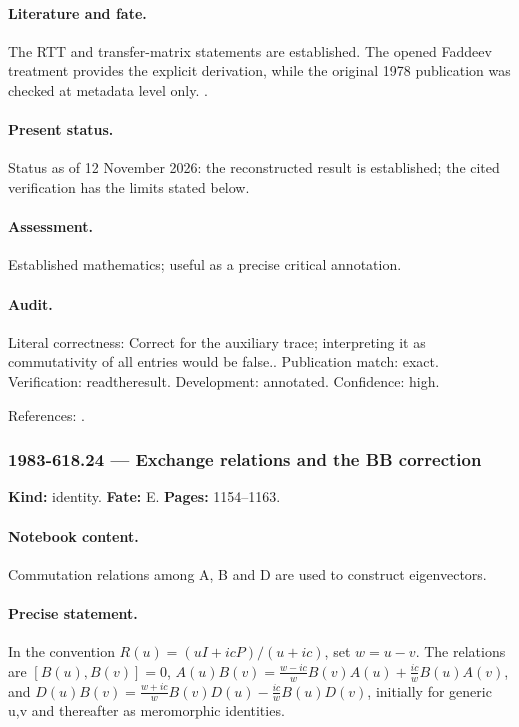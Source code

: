 \paragraph{Literature and fate.} The RTT and transfer-matrix statements are established. The opened Faddeev treatment provides the explicit derivation, while the original 1978 publication was checked at metadata level only. \citep{sklyaninfaddeev1978quantum,faddeev1996bethe}.

\paragraph{Present status.} Status as of 12 November 2026: the reconstructed result is established; the cited verification has the limits stated below.

\paragraph{Assessment.} Established mathematics; useful as a precise critical annotation.

\paragraph{Audit.} Literal correctness: Correct for the auxiliary trace; interpreting it as commutativity of all entries would be false.. Publication match: exact. Verification: readtheresult. Development: annotated. Confidence: high.

\noindent References: \citep{sklyaninfaddeev1978quantum,faddeev1996bethe}.\par

\subsubsection{1983-618.24 --- Exchange relations and the BB correction}

\label{item:1983-618.24}

\noindent\textbf{Kind:} identity. \textbf{Fate:} E. \textbf{Pages:} 1154--1163.\par

\paragraph{Notebook content.} Commutation relations among A, B and D are used to construct eigenvectors.

\paragraph{Precise statement.} In the convention $R(u)=(uI+icP)/(u+ic)$, set $w=u-v$. The relations are $[B(u),B(v)]=0$, $A(u)B(v)=\frac{w-ic}{w}B(v)A(u)+\frac{ic}{w}B(u)A(v)$, and $D(u)B(v)=\frac{w+ic}{w}B(v)D(u)-\frac{ic}{w}B(u)D(v)$, initially for generic u,v and thereafter as meromorphic identities.

